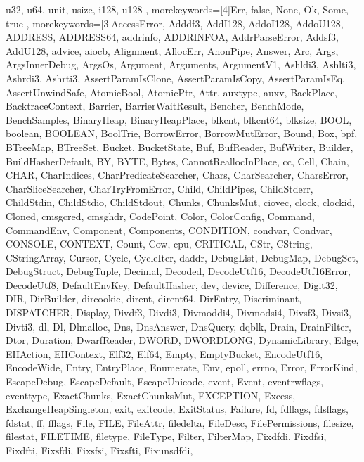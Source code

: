 \documentclass[aspectratio=169]{beamer}
\begin{document}
{{u32, u64, unit, usize, i128, u128}  %
%
, morekeywords=[4]{Err, false, None, Ok, Some, true}  %
, morekeywords=[3]{AccessError, Adddf3, AddI128, AddoI128, AddoU128, ADDRESS,
ADDRESS64, addrinfo, ADDRINFOA, AddrParseError, Addsf3, AddU128, advice, aiocb,
Alignment, AllocErr, AnonPipe, Answer, Arc, Args, ArgsInnerDebug, ArgsOs,
Argument, Arguments, ArgumentV1, Ashldi3, Ashlti3, Ashrdi3, Ashrti3,
AssertParamIsClone, AssertParamIsCopy, AssertParamIsEq, AssertUnwindSafe,
AtomicBool, AtomicPtr, Attr, auxtype, auxv, BackPlace, BacktraceContext,
Barrier, BarrierWaitResult, Bencher, BenchMode, BenchSamples, BinaryHeap,
BinaryHeapPlace, blkcnt, blkcnt64, blksize, BOOL, boolean, BOOLEAN, BoolTrie,
BorrowError, BorrowMutError, Bound, Box, bpf, BTreeMap, BTreeSet, Bucket,
BucketState, Buf, BufReader, BufWriter, Builder, BuildHasherDefault, BY, BYTE,
Bytes, CannotReallocInPlace, cc, Cell, Chain, CHAR, CharIndices,
CharPredicateSearcher, Chars, CharSearcher, CharsError, CharSliceSearcher,
CharTryFromError, Child, ChildPipes, ChildStderr, ChildStdin, ChildStdio,
ChildStdout, Chunks, ChunksMut, ciovec, clock, clockid, Cloned, cmsgcred,
cmsghdr, CodePoint, Color, ColorConfig, Command, CommandEnv, Component,
Components, CONDITION, condvar, Condvar, CONSOLE, CONTEXT, Count, Cow, cpu,
CRITICAL, CStr, CString, CStringArray, Cursor, Cycle, CycleIter, daddr,
DebugList, DebugMap, DebugSet, DebugStruct, DebugTuple, Decimal, Decoded,
DecodeUtf16, DecodeUtf16Error, DecodeUtf8, DefaultEnvKey, DefaultHasher, dev,
device, Difference, Digit32, DIR, DirBuilder, dircookie, dirent, dirent64,
DirEntry, Discriminant, DISPATCHER, Display, Divdf3, Divdi3, Divmoddi4,
Divmodsi4, Divsf3, Divsi3, Divti3, dl, Dl, Dlmalloc, Dns, DnsAnswer, DnsQuery,
dqblk, Drain, DrainFilter, Dtor, Duration, DwarfReader, DWORD, DWORDLONG,
DynamicLibrary, Edge, EHAction, EHContext, Elf32, Elf64, Empty, EmptyBucket,
EncodeUtf16, EncodeWide, Entry, EntryPlace, Enumerate, Env, epoll, errno, Error,
ErrorKind, EscapeDebug, EscapeDefault, EscapeUnicode, event, Event,
eventrwflags, eventtype, ExactChunks, ExactChunksMut, EXCEPTION, Excess,
ExchangeHeapSingleton, exit, exitcode, ExitStatus, Failure, fd, fdflags,
fdsflags, fdstat, ff, fflags, File, FILE, FileAttr, filedelta, FileDesc,
FilePermissions, filesize, filestat, FILETIME, filetype, FileType, Filter,
FilterMap, Fixdfdi, Fixdfsi, Fixdfti, Fixsfdi, Fixsfsi, Fixsfti, Fixunsdfdi,
}}
\end{document}
